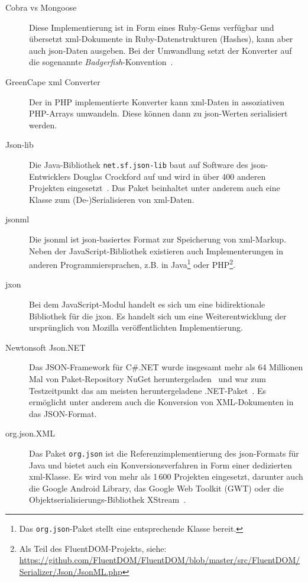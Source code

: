 \begin{description}
    \item[Cobra vs Mongoose] Diese Implementierung ist in Form eines Ruby-Gems verfügbar und übersetzt \acrshort{xml}-Dokumente in Ruby-Datenstrukturen (Hashes), kann aber auch \acrshort{json}-Daten ausgeben. Bei der Umwandlung setzt der  Konverter auf die sogenannte \emph{Badgerfish}-Konvention~\cite[Abschn.~3]{cobravsmongoose,open311-conventions}.
    \item[GreenCape \acrshort{xml} Converter] Der in PHP implementierte Konverter kann \acrshort{xml}-Daten in asso\-ziativen PHP-Arrays umwandeln. Diese können dann zu \acrshort{json}-Werten serialisiert werden.
    \item[Json-lib] Die Java-Bibliothek \texttt{net.sf.json-lib} baut auf Software des \acrshort{json}-Entwicklers Douglas Crockford auf und wird in über 400 anderen Projekten eingesetzt~\cite{mvn-jsonlib}. Das Paket beinhaltet unter anderem auch eine Klasse zum (De-)Serialisieren von \acrshort{xml}-Daten.
    \item[{\acrshort{jsonml}}] Die \acrfull{jsonml} ist \acrshort{json}-basiertes Format zur Speicherung von \acrshort{xml}-Markup. Neben der JavaScript-Bibliothek existieren auch Implementerungen in anderen Programmiersprachen, z.B. in Java\footnote{Das \texttt{org.json}-Paket stellt eine entsprechende Klasse bereit.}  oder PHP\footnote{Als Teil des FluentDOM-Projekts, siehe: \url{https://github.com/FluentDOM/FluentDOM/blob/master/src/FluentDOM/Serializer/Json/JsonML.php}}.
    \item[{\acrshort{jxon}}] Bei dem JavaScript-Modul handelt es sich um eine bidirektionale Bibliothek für die \acrlong{jxon}. Es handelt sich um eine Weiterentwicklung der ursprünglich von Mozilla veröffentlichten Implementierung.
    \item[Newtonsoft Json.NET] Das JSON-Framework für C\#.NET wurde insgesamt mehr als 64 Millionen Mal von Paket-Repository NuGet heruntergeladen~\cite{nugetjsonnet} und war zum Testzeitpunkt das am meisten heruntergeladene .NET-Paket~\cite{nugetstatistics}. Es ermöglicht unter anderem auch die Konversion von XML-Dokumenten in das JSON-Format.
    \item[org.json.XML] Das Paket \texttt{org.json} ist die Referenzimplementierung des \acrshort{json}-Formats für Java und bietet auch ein Konversionsverfahren in Form einer dedizierten \acrshort{xml}-Klasse. Es wird von mehr als 1\,600 Projekten eingesetzt, darunter auch die Google Android Library, das Google Web Toolkit (GWT) oder die Objektserialisierungs\hyp{}Bibliothek XStream~\cite{mvn-orgjsonxml}.

\end{description}

